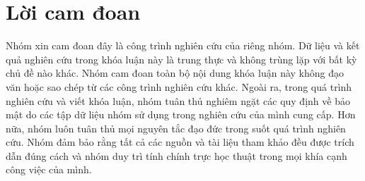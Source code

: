 \chapter*{Lời cam đoan}
\label{reassurances}

Nhóm xin cam đoan đây là công trình nghiên cứu của riêng nhóm. Dữ liệu và kết quả nghiên cứu trong khóa luận này là trung thực và không trùng lặp với bất kỳ chủ đề nào khác. Nhóm cam đoan toàn bộ nội dung khóa luận này không đạo văn hoặc sao chép từ các công trình nghiên cứu khác. Ngoài ra, trong quá trình nghiên cứu và viết khóa luận, nhóm tuân thủ nghiêm ngặt các quy định về bảo mật do các tập dữ liệu nhóm sử dụng trong nghiên cứu của mình cung cấp. Hơn nữa, nhóm luôn tuân thủ mọi nguyên tắc đạo đức trong suốt quá trình nghiên cứu. Nhóm đảm bảo rằng tất cả các nguồn và tài liệu tham khảo đều được trích dẫn đúng cách và nhóm duy trì tính chính trực học thuật trong mọi khía cạnh công việc của mình.
